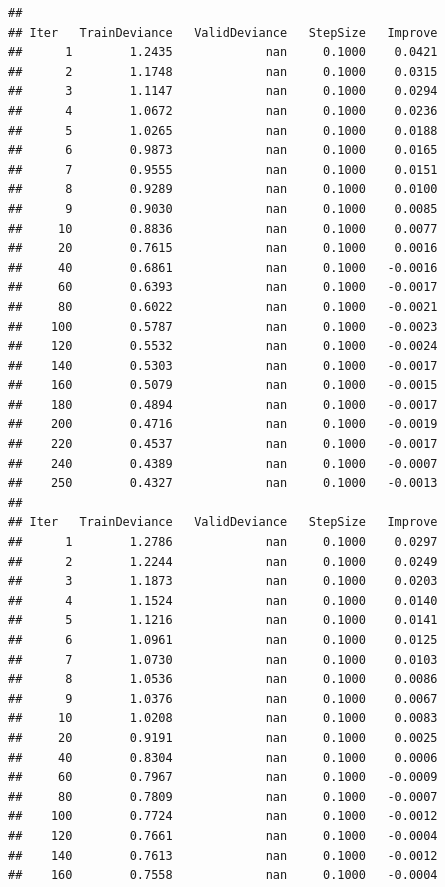 \documentclass[]{book}
\begin{document}
\begin{verbatim}
## 
## Iter   TrainDeviance   ValidDeviance   StepSize   Improve
##      1        1.2435             nan     0.1000    0.0421
##      2        1.1748             nan     0.1000    0.0315
##      3        1.1147             nan     0.1000    0.0294
##      4        1.0672             nan     0.1000    0.0236
##      5        1.0265             nan     0.1000    0.0188
##      6        0.9873             nan     0.1000    0.0165
##      7        0.9555             nan     0.1000    0.0151
##      8        0.9289             nan     0.1000    0.0100
##      9        0.9030             nan     0.1000    0.0085
##     10        0.8836             nan     0.1000    0.0077
##     20        0.7615             nan     0.1000    0.0016
##     40        0.6861             nan     0.1000   -0.0016
##     60        0.6393             nan     0.1000   -0.0017
##     80        0.6022             nan     0.1000   -0.0021
##    100        0.5787             nan     0.1000   -0.0023
##    120        0.5532             nan     0.1000   -0.0024
##    140        0.5303             nan     0.1000   -0.0017
##    160        0.5079             nan     0.1000   -0.0015
##    180        0.4894             nan     0.1000   -0.0017
##    200        0.4716             nan     0.1000   -0.0019
##    220        0.4537             nan     0.1000   -0.0017
##    240        0.4389             nan     0.1000   -0.0007
##    250        0.4327             nan     0.1000   -0.0013
## 
## Iter   TrainDeviance   ValidDeviance   StepSize   Improve
##      1        1.2786             nan     0.1000    0.0297
##      2        1.2244             nan     0.1000    0.0249
##      3        1.1873             nan     0.1000    0.0203
##      4        1.1524             nan     0.1000    0.0140
##      5        1.1216             nan     0.1000    0.0141
##      6        1.0961             nan     0.1000    0.0125
##      7        1.0730             nan     0.1000    0.0103
##      8        1.0536             nan     0.1000    0.0086
##      9        1.0376             nan     0.1000    0.0067
##     10        1.0208             nan     0.1000    0.0083
##     20        0.9191             nan     0.1000    0.0025
##     40        0.8304             nan     0.1000    0.0006
##     60        0.7967             nan     0.1000   -0.0009
##     80        0.7809             nan     0.1000   -0.0007
##    100        0.7724             nan     0.1000   -0.0012
##    120        0.7661             nan     0.1000   -0.0004
##    140        0.7613             nan     0.1000   -0.0012
##    160        0.7558             nan     0.1000   -0.0004

\end{verbatim}
\end{document}
